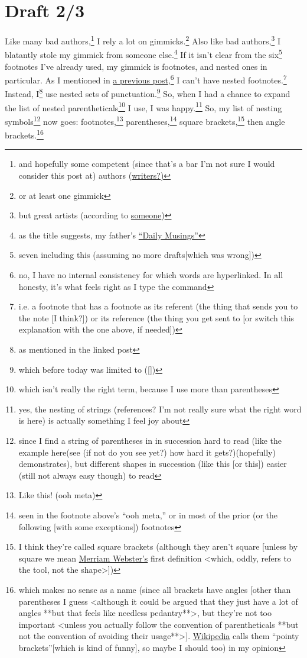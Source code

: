 \documentclass[a4paper]{article}
\newcommand{\say}[1]{``#1''}
\newcommand{\1}{\={a}}
\newcommand{\2}{\={e}}
\newcommand{\3}{\={\i}}
\newcommand{\4}{\=o}
\newcommand{\5}{\=u}
\newcommand{\6}{\={A}}
\newcommand{\<}{\textless}
\renewcommand{\>}{\textgreater}
\renewcommand{\,}{\textsuperscript{,}}
\begin{document}
\section{Draft 2/3}
Like many bad authors,\footnote{and hopefully some competent (since that's a bar I'm not sure I would consider this post at) authors (\href{https://archangelink.com/writer-versus-author/}{writers?)}} I rely a lot on gimmicks.\footnote{or at least one gimmick}
Also like bad authors,\footnote{but great artists (according to \href{https://quoteinvestigator.com/2013/03/06/artists-steal/}{someone})} I blatantly stole my gimmick from someone else.\footnote{as the title suggests, my father's \href{http://www.cs.grinnell.edu/~rebelsky/musings/}{\say{Daily Musings}}}
If it isn't clear from the six\footnote{seven including this (assuming no more drafts[which was wrong])} footnotes I've already used, my gimmick is footnotes, and nested ones in particular.
As I mentioned in \href{https://j.rebelsky.com/arranging-for-bagpipe}{a previous post},\footnote{no, I have no internal consistency for which words are hyperlinked. In all honesty, it's what feels right as I type the command} I can't have nested footnotes.\footnote{i.e. a footnote that has a footnote as its referent (the thing that sends you to the note [I think?]) or its reference (the thing you get sent to [or switch this explanation with the one above, if needed])}
Instead, I\footnote{as mentioned in the linked post} use nested sets of punctuation.\footnote{which before today was limited to ([])}
So, when I had a chance to expand the list of nested parentheticals\footnote{which isn't really the right term, because I use more than parentheses} I use, I was happy.\footnote{yes, the nesting of strings (references? I'm not really sure what the right word is here) is actually something I feel joy about}
So, my list of nesting symbols\footnote{since I find a string of parentheses in in succession  hard to read (like the example here(see (if not do you see yet?) how hard it gets?)(hopefully) demonstrates), but different shapes in succession (like this [or this]) easier (still not always easy though) to read} now goes: footnotes,\footnote{Like this! (ooh meta)} parentheses,\footnote{seen in the footnote above's \say{ooh meta,} or in most of the prior (or the following [with some exceptions]) footnotes} square brackets,\footnote{I think they're called square brackets (although they aren't square [unless by square we mean \href{https://www.merriam-webster.com/dictionary/square}{Merriam Webster's} first definition \<which, oddly, refers to the tool, not the shape\>])} then angle brackets.\footnote{which makes no sense as a name (since all brackets have angles [other than parentheses I guess \<although it could be argued that they just have a lot of angles **but that feels like needless pedantry**\>, but they're not too important \<unless you actually follow the convention of parentheticals **but not the convention of avoiding their usage**\>]. \href{https://en.wikipedia.org/wiki/Bracket}{Wikipedia} calls them \say{pointy brackets}[which is kind of funny], so maybe I should too) in my opinion}
\end{document}
